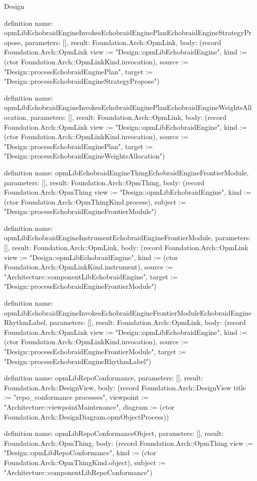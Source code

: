 \begin{lexlean}{Design}
\begin{semanticmodule}
definition{
  name: opmLibEchobraidEngineInvokesEchobraidEnginePlanEchobraidEngineStrategyPropose,
  parameters: [],
  result: Foundation.Arch::OpmLink,
  body: (record Foundation.Arch::OpmLink {view := "Design::opmLibEchobraidEngine", kind := (ctor Foundation.Arch::OpmLinkKind.invocation), source := "Design::processEchobraidEnginePlan", target := "Design::processEchobraidEngineStrategyPropose"})
}

definition{
  name: opmLibEchobraidEngineInvokesEchobraidEnginePlanEchobraidEngineWeightsAllocation,
  parameters: [],
  result: Foundation.Arch::OpmLink,
  body: (record Foundation.Arch::OpmLink {view := "Design::opmLibEchobraidEngine", kind := (ctor Foundation.Arch::OpmLinkKind.invocation), source := "Design::processEchobraidEnginePlan", target := "Design::processEchobraidEngineWeightsAllocation"})
}

definition{
  name: opmLibEchobraidEngineThingEchobraidEngineFrontierModule,
  parameters: [],
  result: Foundation.Arch::OpmThing,
  body: (record Foundation.Arch::OpmThing {view := "Design::opmLibEchobraidEngine", kind := (ctor Foundation.Arch::OpmThingKind.process), subject := "Design::processEchobraidEngineFrontierModule"})
}

definition{
  name: opmLibEchobraidEngineInstrumentEchobraidEngineFrontierModule,
  parameters: [],
  result: Foundation.Arch::OpmLink,
  body: (record Foundation.Arch::OpmLink {view := "Design::opmLibEchobraidEngine", kind := (ctor Foundation.Arch::OpmLinkKind.instrument), source := "Architecture::componentLibEchobraidEngine", target := "Design::processEchobraidEngineFrontierModule"})
}

definition{
  name: opmLibEchobraidEngineInvokesEchobraidEngineFrontierModuleEchobraidEngineRhythmLabel,
  parameters: [],
  result: Foundation.Arch::OpmLink,
  body: (record Foundation.Arch::OpmLink {view := "Design::opmLibEchobraidEngine", kind := (ctor Foundation.Arch::OpmLinkKind.invocation), source := "Design::processEchobraidEngineFrontierModule", target := "Design::processEchobraidEngineRhythmLabel"})
}

definition{
  name: opmLibRepoConformance,
  parameters: [],
  result: Foundation.Arch::DesignView,
  body: (record Foundation.Arch::DesignView {title := "repo_conformance processes", viewpoint := "Architecture::viewpointMaintenance", diagram := (ctor Foundation.Arch::DesignDiagram.opmObjectProcess)})
}

definition{
  name: opmLibRepoConformanceObject,
  parameters: [],
  result: Foundation.Arch::OpmThing,
  body: (record Foundation.Arch::OpmThing {view := "Design::opmLibRepoConformance", kind := (ctor Foundation.Arch::OpmThingKind.object), subject := "Architecture::componentLibRepoConformance"})
}


\end{semanticmodule}
\end{lexlean}
